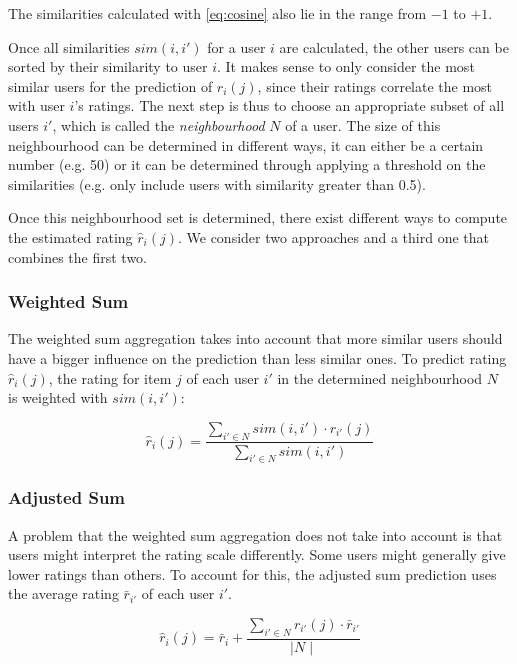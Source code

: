The similarities calculated with \eqref{eq:cosine} also lie in the range from $-1$ to $+1$.
\newline

Once all similarities $sim(i,i')$ for a user $i$ are calculated, the other users can be sorted by their similarity to user $i$. It makes sense to only consider the most similar users for the prediction of $\hat{r}_i(j)$, since their ratings correlate the most with user $i$'s ratings. The next step is thus to choose an appropriate subset of all users $i'$, which is called the \textit{neighbourhood} $N$ of a user. The size of this neighbourhood can be determined in different ways, it can either be a certain number (e.g. 50) or it can be determined through applying a threshold on the similarities (e.g. only include users with similarity greater than 0.5).

Once this neighbourhood set is determined, there exist different ways to compute the estimated rating $\hat{r}_i(j)$. We consider two approaches and a third one that combines the first two.

\subsubsection{Weighted Sum}
\label{ssst:weightedsum} The weighted sum aggregation takes into account that more similar users should have a bigger influence on the prediction than less similar ones. To predict rating $\hat{r}_i(j)$, the rating for item $j$ of each user $i'$ in the determined neighbourhood $N$ is weighted with $sim(i,i')$:

\begin{equation}
\hat{r}_i(j) = \frac{\sum_{i' \in N}{sim(i,i')\cdot r_{i'}(j)}}{\sum_{i' \in N}{sim(i,i')}}
\label{eq:weightedsum}
\end{equation}

\subsubsection{Adjusted Sum}
\label{ssst:adjustedsum} A problem that the weighted sum aggregation does not take into account is that users might interpret the rating scale differently. Some users might generally give lower ratings than others. To account for this, the adjusted sum prediction uses the average rating $\bar{r}_{i'}$ of each user $i'$.

\begin{equation}
\hat{r}_i(j) = \bar{r}_i + \frac{\sum_{i' \in N}{r_{i'}(j)\cdot \bar{r}_{i'}}}{\mid N\mid}
\label{eq:adjustedsum}
\end{equation}

